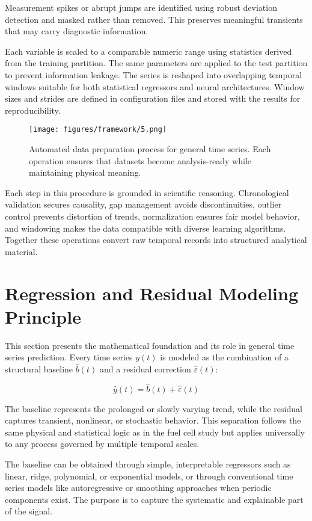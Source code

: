  Measurement spikes or abrupt jumps are identified using robust deviation detection and masked rather than removed. This preserves meaningful transients that may carry diagnostic information.

 Each variable is scaled to a comparable numeric range using statistics derived from the training partition. The same parameters are applied to the test partition to prevent information leakage.
The series is reshaped into overlapping temporal windows suitable for both statistical regressors and neural architectures. Window sizes and strides are defined in configuration files and stored with the results for reproducibility.

\begin{figure}[htbp]
\centering
\texttt{[image: figures/framework/5.png]}
\caption{Automated data preparation process for general time series. Each operation ensures that datasets become analysis-ready while maintaining physical meaning.}
\label{fig:data_preparation_ts}
\end{figure}

Each step in this procedure is grounded in scientific reasoning. Chronological validation secures causality, gap management avoids discontinuities, outlier control prevents distortion of trends, normalization ensures fair model behavior, and windowing makes the data compatible with diverse learning algorithms. Together these operations convert raw temporal records into structured analytical material.

\section{Regression and Residual Modeling Principle}

This section presents the mathematical foundation and its role in general time series prediction. Every time series $y(t)$ is modeled as the combination of a structural baseline $\hat{b}(t)$ and a residual correction $\hat{\varepsilon}(t)$:

\[
\hat{y}(t) = \hat{b}(t) + \hat{\varepsilon}(t)
\]

The baseline represents the prolonged or slowly varying trend, while the residual captures transient, nonlinear, or stochastic behavior. This separation follows the same physical and statistical logic as in the fuel cell study but applies universally to any process governed by multiple temporal scales.

 The baseline can be obtained through simple, interpretable regressors such as linear, ridge, polynomial, or exponential models, or through conventional time series models like autoregressive or smoothing approaches when periodic components exist. The purpose is to capture the systematic and explainable part of the signal.


